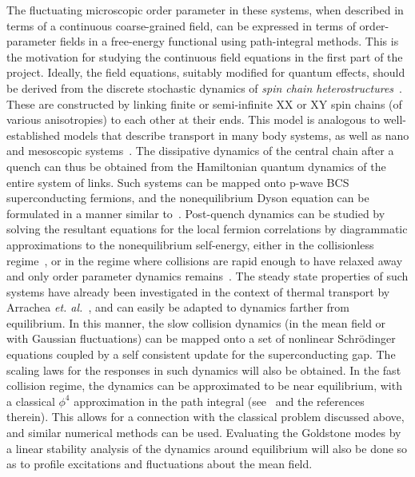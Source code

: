 \documentclass[a4paper,11pt,color]{article}
\begin{document}
\begin{enumerate}[label=(\alph*)]
The fluctuating microscopic order parameter in these systems, when  described in terms of a continuous coarse-grained field, can be expressed in terms of order-parameter fields in a free-energy functional using path-integral methods. This is the motivation for studying the continuous field equations in the first part of the project. Ideally, the field equations, suitably modified for quantum effects, should be derived from the discrete stochastic dynamics of \textit{spin chain heterostructures}~\cite{arrachea}. These are  constructed by linking finite or semi-infinite XX or XY spin chains (of various anisotropies) to each other at their ends. This model is analogous to well-established models that describe transport in many body systems, as well as nano and mesoscopic systems~\cite{arrachea,openspin, imry}. The dissipative dynamics of the central chain after a quench can thus be obtained from the Hamiltonian quantum dynamics of the entire system of links. Such systems can be mapped onto p-wave BCS superconducting fermions, and the nonequilibrium Dyson equation can be formulated in a manner similar to~\cite{gorkov, volkov}. Post-quench dynamics can be studied by solving the resultant equations for the local fermion correlations by diagrammatic approximations to the nonequilibrium self-energy, either in the collisionless regime~\cite{volkov,
ncnsd2012}, or in the regime where collisions are rapid enough to have relaxed away and only order parameter dynamics remains~\cite{ncnsd2012}. The steady state properties of such systems have already been investigated in the context of thermal transport by Arrachea \textit{et. al.}~\cite{arrachea}, and can easily be adapted to dynamics farther from equilibrium. In this manner, the slow collision dynamics (in the mean field or with Gaussian fluctuations) can be mapped onto a set of nonlinear Schr\"odinger equations coupled by a self consistent update for the superconducting gap. The scaling laws for the responses in such dynamics will also be obtained.  In the fast collision regime, the dynamics can be approximated to be near equilibrium, with a classical $\phi^4$ approximation in the path integral (see~\cite{colrev} and the references therein). This allows for a connection with the classical problem discussed above, and similar numerical methods can be used. Evaluating the Goldstone modes by a linear 
stability analysis of the dynamics around equilibrium will also be done so as to profile excitations and fluctuations about the mean field.


\end{enumerate}
\end{document}
